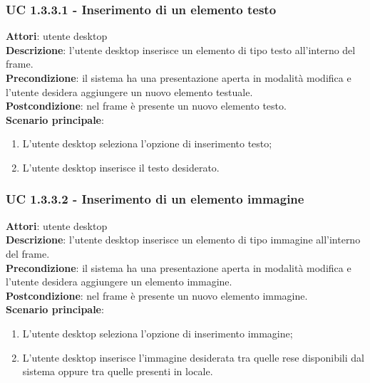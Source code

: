 \subsubsection{UC 1.3.3.1 - Inserimento di un elemento testo}{
	\label{uc1.3.3.1}
	\textbf{Attori}: utente desktop \\
	\textbf{Descrizione}: l'utente desktop inserisce un elemento di tipo testo all'interno del frame. \\
	\textbf{Precondizione}: il sistema ha una presentazione aperta in modalità modifica e l'utente desidera aggiungere un nuovo elemento testuale.	\\
	\textbf{Postcondizione}: nel frame è presente un nuovo elemento testo.	\\
	\textbf{Scenario principale}:
	\begin{enumerate}
		\item L'utente desktop seleziona l'opzione di inserimento testo;
		\item L'utente desktop inserisce il testo desiderato.
	\end{enumerate}
	}
\subsubsection{UC 1.3.3.2 - Inserimento di un elemento immagine}{
	\label{uc1.3.3.2}
	\textbf{Attori}: utente desktop \\
	\textbf{Descrizione}: l'utente desktop inserisce un elemento di tipo immagine all'interno del frame. \\
	\textbf{Precondizione}: il sistema ha una presentazione aperta in modalità modifica e l'utente desidera aggiungere un elemento immagine.	\\
	\textbf{Postcondizione}: nel frame è presente un nuovo elemento immagine.	\\
	\textbf{Scenario principale}:
	\begin{enumerate}
		\item L'utente desktop seleziona l'opzione di inserimento immagine;
		\item L'utente desktop inserisce l'immagine desiderata tra quelle rese disponibili dal sistema oppure tra quelle presenti in locale.
	\end{enumerate}
	}
